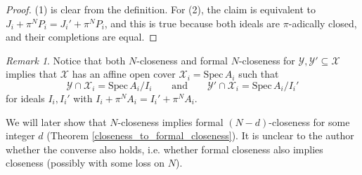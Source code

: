 \documentclass{article}
\theoremstyle{definition}
\theoremstyle{plain}
\theoremstyle{remark}
\newtheorem{remark}[defn]{Remark}
\newcommand{\spec}{\mathrm{Spec}\,}
\begin{document}
	\begin{proof}
		(1) is clear from the definition. For (2), the claim is equivalent to $J_i + \pi^NP_i = J_i' + \pi^NP_i$, and this is true because both ideals are $\pi$-adically closed, and their completions are equal.
	\end{proof}
	\begin{remark}
		Notice that both $N$-closeness and formal $N$-closeness for $\mathcal{Y}, \mathcal{Y}'\subseteq \mathcal{X}$ implies that $\mathcal{X}$ has an affine open cover $\mathcal{X}_i = \spec A_i$ such that 
		\[\mathcal{Y}\cap \mathcal{X}_i = \spec A_i/I_i\qquad\text{and}\qquad\mathcal{Y}'\cap\mathcal{X}_i = \spec A_i/I_i'\]
		for ideals $I_i, I_i'$ with $I_i+ \pi^N A_i = I_i' + \pi^N A_i$.
		
		We will later show that $N$-closeness implies formal $(N-d)$-closeness for some integer $d$ (Theorem \ref{closeness_to_formal_closeness}). It is unclear to the author whether the converse also holds, i.e. whether formal closeness also implies closeness (possibly with some loss on $N$).
	\end{remark}
	
\end{document}
